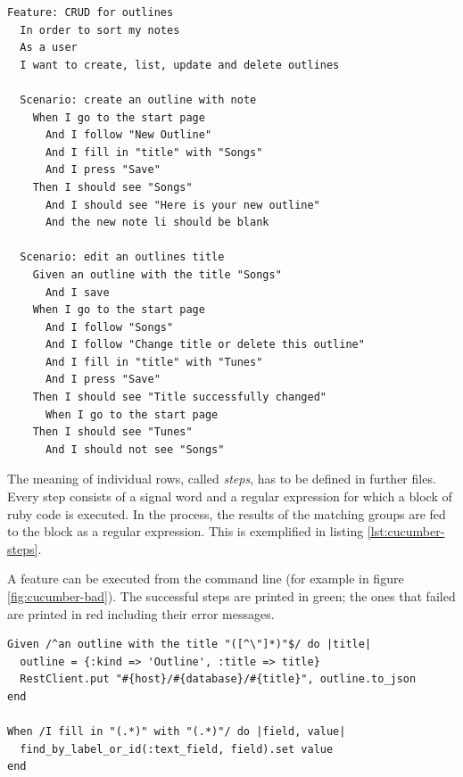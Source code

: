 \lstset{language=ruby, style=cucumber}
\medskip
\begin{lstlisting}[caption=A Cucumber feature with two scenarios,label=lst:cucumber-feature]
Feature: CRUD for outlines
  In order to sort my notes
  As a user
  I want to create, list, update and delete outlines
  
  Scenario: create an outline with note
    When I go to the start page
      And I follow "New Outline"
      And I fill in "title" with "Songs"
      And I press "Save"
    Then I should see "Songs"
      And I should see "Here is your new outline"
      And the new note li should be blank
      
  Scenario: edit an outlines title
    Given an outline with the title "Songs"
      And I save
    When I go to the start page
      And I follow "Songs"
      And I follow "Change title or delete this outline"
      And I fill in "title" with "Tunes"
      And I press "Save"
    Then I should see "Title successfully changed"
      When I go to the start page
    Then I should see "Tunes"
      And I should not see "Songs"
\end{lstlisting}

The meaning of individual rows, called \textit{steps}, has to be defined in further files. Every step consists of a signal word and a regular expression for which a block of ruby code is executed. In the process, the results of the matching groups are fed to the block as a regular expression. This is exemplified in listing \ref{lst:cucumber-steps}.

A feature can be executed from the command line (for example in figure \ref{fig:cucumber-bad}). The successful steps are printed in green; the ones that failed are printed in red including their error messages.

\medskip
\begin{lstlisting}[caption=Cucumber step definition,label=lst:cucumber-steps]
Given /^an outline with the title "([^\"]*)"$/ do |title|
  outline = {:kind => 'Outline', :title => title}
  RestClient.put "#{host}/#{database}/#{title}", outline.to_json
end

When /I fill in "(.*)" with "(.*)"/ do |field, value|
  find_by_label_or_id(:text_field, field).set value
end
\end{lstlisting}

